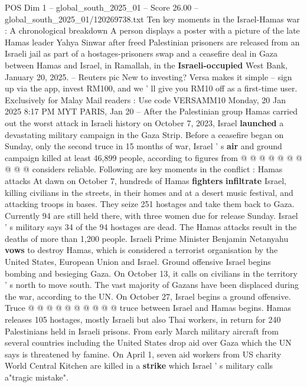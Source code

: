 \begin{textsample}{POS Dim 1 – global\_south\_2025\_01 – Score 26.00 – global\_south\_2025\_01/120269738.txt}  \label{ex:f1_pos_302}
Ten key moments in the Israel-Hamas war : A chronological breakdown A person displays a poster with a picture of the late Hamas leader Yahya Sinwar after freed Palestinian prisoners are released from an Israeli jail as part of a hostages-prisoners swap and a ceasefire deal in Gaza between Hamas and Israel, in Ramallah, in the \textbf{Israeli-occupied} West Bank, January 20, 2025. -- Reuters pic New to investing?
Versa makes it simple -- sign up via the app, invest RM100, and we ' ll give you RM10 off as a first-time user.
Exclusively for Malay Mail readers : Use code VERSAMM10 Monday, 20 Jan 2025 8:17 PM MYT PARIS, Jan 20 -- After the Palestinian group Hamas carried out the worst attack in Israeli history on October 7, 2023, Israel \textbf{launched} a devastating military campaign in the Gaza Strip.
Before a ceasefire began on Sunday, only the second truce in 15 months of war, Israel ' s \textbf{air} and ground campaign killed at least 46,899 people, according to figures from @ @ @ @ @ @ @ @ @ @ considers reliable.
Following are key moments in the conflict : Hamas attacks At dawn on October 7, hundreds of Hamas \textbf{fighters} \textbf{infiltrate} Israel, killing civilians in the streets, in their homes and at a desert music festival, and attacking troops in bases.
They seize 251 hostages and take them back to Gaza.
Currently 94 are still held there, with three women due for release Sunday.
Israel ' s military says 34 of the 94 hostages are dead.
The Hamas attacks result in the deaths of more than 1,200 people.
Israeli Prime Minister Benjamin Netanyahu \textbf{vows} to destroy Hamas, which is considered a terrorist organisation by the United States, European Union and Israel.
Ground offensive Israel begins bombing and besieging Gaza.
On October 13, it calls on civilians in the territory ' s north to move south.
The vast majority of Gazans have been displaced during the war, according to the UN.
On October 27, Israel begins a ground offensive.
Truce @ @ @ @ @ @ @ @ @ @ truce between Israel and Hamas begins.
Hamas releases 105 hostages, mostly Israeli but also Thai workers, in return for 240 Palestinians held in Israeli prisons.
From early March military aircraft from several countries including the United States drop aid over Gaza which the UN says is threatened by famine.
On April 1, seven aid workers from US charity World Central Kitchen are killed in a \textbf{strike} which Israel ' s military calls a"tragic mistake".

\end{textsample}
